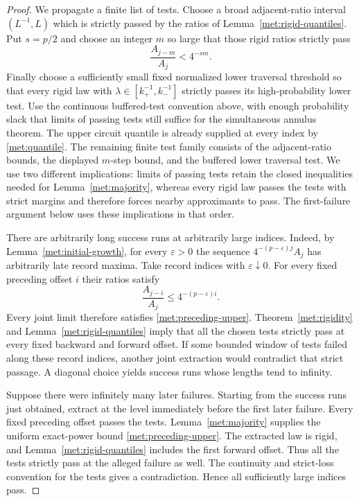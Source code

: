 \documentclass[11pt]{article}
\numberwithin{equation}{section}
\theoremstyle{definition}
\theoremstyle{remark}
\newcommand{\1}{\mathbf 1}
\begin{document}
\begin{proof}
We propagate a finite list of tests.  Choose a broad adjacent-ratio
interval $(L^{-1},L)$ which is strictly passed by the ratios of
Lemma~\ref{met:rigid-quantiles}.  Put $s=p/2$ and choose an integer
$m$ so large that those rigid ratios strictly pass
\[
 \frac{A_{j-m}}{A_j}<4^{-sm}.
\]
Finally choose a sufficiently small fixed normalized lower
traversal threshold so that every rigid law with
$\lambda\in[k_+^{-1},k_-^{-1}]$ strictly passes its
high-probability lower test.  Use the continuous buffered-test
convention above, with enough probability slack that limits of
passing tests still suffice for the simultaneous annulus theorem.
The upper circuit quantile is already supplied at every index by
\eqref{met:quantile}.  The remaining finite test family consists of
the adjacent-ratio bounds, the displayed $m$-step bound, and the
buffered lower traversal test.  We use two different implications:
limits of passing tests retain the closed inequalities needed for
Lemma~\ref{met:majority}, whereas every rigid law passes the tests
with strict margins and therefore forces nearby approximants to
pass.  The first-failure argument below uses these implications in
that order.

There are arbitrarily long success runs at arbitrarily large
indices.  Indeed, by Lemma~\ref{met:initial-growth}, for every
$\varepsilon>0$ the sequence
$4^{-(p-\varepsilon)j}A_j$ has arbitrarily late record maxima.
Take record indices with $\varepsilon\downarrow0$.  For every
fixed preceding offset $i$ their ratios satisfy
\[
 \frac{A_{j-i}}{A_j}\leq4^{-(p-\varepsilon)i}.
\]
Every joint limit therefore satisfies
\eqref{met:preceding-upper}.  Theorem~\ref{met:rigidity} and
Lemma~\ref{met:rigid-quantiles} imply that all the chosen tests
strictly pass at every fixed backward and forward offset.
If some bounded window of tests failed along these record indices,
another joint extraction would contradict that strict passage.
A diagonal choice yields success runs whose lengths tend to
infinity.

Suppose there were infinitely many later failures.  Starting from
the success runs just obtained, extract at the level immediately
before the first later failure.  Every fixed preceding offset
passes the tests.  Lemma~\ref{met:majority} supplies the uniform
exact-power bound \eqref{met:preceding-upper}.  The extracted law
is rigid, and Lemma~\ref{met:rigid-quantiles} includes the first
forward offset.  Thus all the tests strictly pass at the alleged
failure as well.  The continuity and strict-loss convention for
the tests gives a contradiction.  Hence all sufficiently large
indices pass.


\end{proof}
\end{document}

